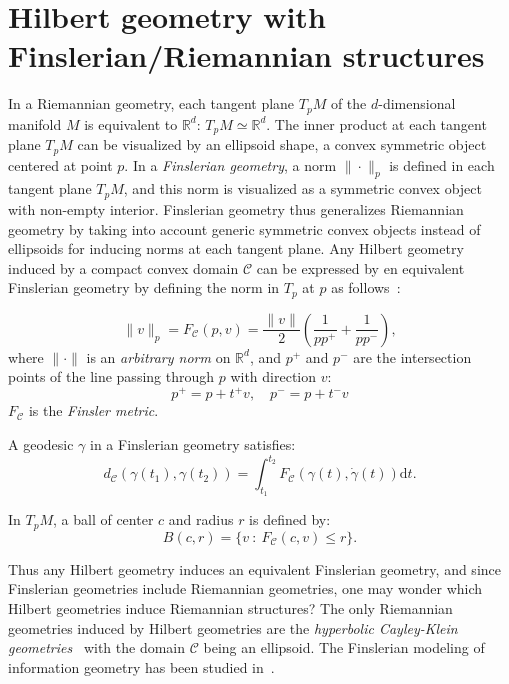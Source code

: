 \documentclass[graybox]{svmult}
\def\dt{\mathrm{d}t}
\def\calC{\mathcal{C}}
\def\bbR{\mathbb{R}}
\begin{document}
\section{Hilbert geometry with Finslerian/Riemannian structures\label{sec:HGFG}}
In a Riemannian geometry, each tangent plane $T_pM$ of the $d$-dimensional manifold $M$ is equivalent to $\bbR^d$: $T_pM\simeq \bbR^d$.
The inner product at each tangent plane $T_pM$ can be visualized by an ellipsoid shape, a convex symmetric object centered at point $p$.
In a {\em Finslerian geometry},  a norm $\|\cdot\|_p$ is defined in each tangent plane $T_pM$, 
and this norm is visualized as a symmetric convex object with non-empty interior. 
Finslerian geometry thus generalizes Riemannian geometry by taking into account generic symmetric convex objects instead of ellipsoids for inducing norms at each tangent plane.
Any Hilbert geometry induced by a compact convex domain $\calC$ can be expressed by en equivalent Finslerian geometry by defining the norm in $T_p$ at $p$ as follows~\cite{Vernicos-2004}:

\begin{equation}
\|v\|_p = F_\calC(p,v) =\frac{\|v\|}{2} \left( \frac{1}{pp^+} + \frac{1}{pp^-} \right),
\end{equation}
where $\|\cdot\|$ is an {\em arbitrary norm} on $\bbR^d$, and $p^+$ and $p^-$ are the intersection points of the line passing through $p$ with direction $v$:
$$
p^+=p+t^+v,\quad p^-=p+t^-v
$$
$F_\calC$ is the {\em Finsler metric}.


A geodesic $\gamma$ in a Finslerian geometry satisfies:
\begin{equation}
d_\calC(\gamma(t_1),\gamma(t_2)) = \int_{t_1}^{t_2} F_\calC(\gamma(t),\dot\gamma(t)) \dt .
\end{equation}

In $T_pM$, a ball of center $c$ and radius $r$ is defined by:
\begin{equation}
B(c,r)=\{ v \ : \ F_\calC(c,v) \leq r \}.
\end{equation}

Thus any Hilbert geometry induces an equivalent Finslerian geometry, and since Finslerian geometries include Riemannian geometries, one may wonder which Hilbert geometries induce Riemannian structures?
The only Riemannian geometries induced by Hilbert geometries are the {\em hyperbolic Cayley-Klein geometries}~\cite{Richter-2011,LMNN-2016,CayleyClassification-2016} with the domain $\calC$ being an ellipsoid.
The Finslerian modeling of information geometry has been studied in~\cite{Cena-2002,FinslerIG-2016}.
\end{document}

